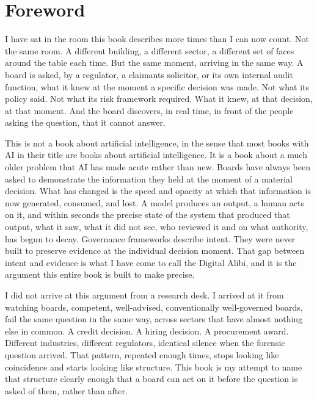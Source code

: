 \chapter*{Foreword}

I have sat in the room this book describes more times than I can now count. Not the same room. A different building, a different sector, a different set of faces around the table each time. But the same moment, arriving in the same way. A board is asked, by a regulator, a claimant\textquotesingle s solicitor, or its own internal audit function, what it knew at the moment a specific decision was made. Not what its policy said. Not what its risk framework required. What it knew, at that decision, at that moment. And the board discovers, in real time, in front of the people asking the question, that it cannot answer.

This is not a book about artificial intelligence, in the sense that most books with AI in their title are books about artificial intelligence. It is a book about a much older problem that AI has made acute rather than new. Boards have always been asked to demonstrate the information they held at the moment of a material decision. What has changed is the speed and opacity at which that information is now generated, consumed, and lost. A model produces an output, a human acts on it, and within seconds the precise state of the system that produced that output, what it saw, what it did not see, who reviewed it and on what authority, has begun to decay. Governance frameworks describe intent. They were never built to preserve evidence at the individual decision moment. That gap between intent and evidence is what I have come to call the Digital Alibi, and it is the argument this entire book is built to make precise.

I did not arrive at this argument from a research desk. I arrived at it from watching boards, competent, well-advised, conventionally well-governed boards, fail the same question in the same way, across sectors that have almost nothing else in common. A credit decision. A hiring decision. A procurement award. Different industries, different regulators, identical silence when the forensic question arrived. That pattern, repeated enough times, stops looking like coincidence and starts looking like structure. This book is my attempt to name that structure clearly enough that a board can act on it before the question is asked of them, rather than after.

